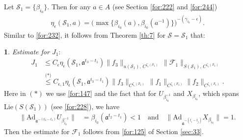 \documentclass[11 pt]{amsart}
\newcommand{\norm}[1]{\lVert#1\rVert}
\theoremstyle{definition}
\newtheorem{sect}{}
\numberwithin{equation}{section}
\begin{document}
Let $\mathcal{S}_1=\{\beta_{i_0}\}$. Then  for any $a\in A$ (see Section \ref{for:222} and \eqref{for:244})
\begin{align}\label{for:148}
\eta_\epsilon(\mathcal{S}_1, a)=\big(\max\{\beta_{i_0}(a), \beta_{i_0}(a^{-1})\}\big)^{-(\gamma_{i_0}-\epsilon)}.
\end{align}
Similar to \eqref{for:232}, it follows from  Theorem \ref{th:7} for $\mathcal{S}=\mathcal{S}_1$ that:
\begin{sect} \emph{Estimate for $J_1$}:
\begin{align*}
 J_1&\leq C_\epsilon \eta_{\epsilon}(\mathcal{S}_1, \mathfrak{a}^{t_{3}-t_{ 1}})\norm{f_3}_{u(\mathcal{S}_1),\,C^{\zeta_\epsilon(\mathcal{S}_1)}}\,\big\|\mathcal{F}_1\big\|_{S(\mathcal{S}_1),\,C^{\zeta_\epsilon(\mathcal{S}_1)}} \\
 &\overset{\text{(*)}}{\leq}C_{\epsilon,1} \eta_{\epsilon}(\mathcal{S}_1, \mathfrak{a}^{t_{3}-t_{ 1}})\norm{f_3}_{C^{\zeta_\epsilon(\mathcal{S}_1)}}\,\big\|f_1\big\|_{C^{\zeta_\epsilon(\mathcal{S}_1)}}
 \big\|f_2\big\|_{C^{\zeta_\epsilon(\mathcal{S}_1)}}.
\end{align*}
Here in $(*)$ we use \eqref{for:147}  and the fact that for  $U_{\beta_{i_0}^{-1}}$ and $X_{\beta_{i_0}}$, which spans $\text{Lie}(S(\mathcal{S}_1))$ (see \eqref{for:228}), we have
  \begin{align*}
 \|\text{Ad}_{\mathfrak{a}^{-(t_{2}-t_{1})}}U_{\beta_{i_0}^{-1}}\|&=\beta_{i_0}(\mathfrak{a}^{t_{2}-t_{ 1}})< 1\quad\text{and}\quad\|\text{Ad}_{\mathfrak{a}^{-(t_{i}-t_{ j})}}X_{\beta_{i_0}}\|=1.
\end{align*}
  Then the estimate for $\mathcal{F}_1$ follows from \eqref{for:125} of Section \ref{sec:33}.

\end{sect}
\end{document}
